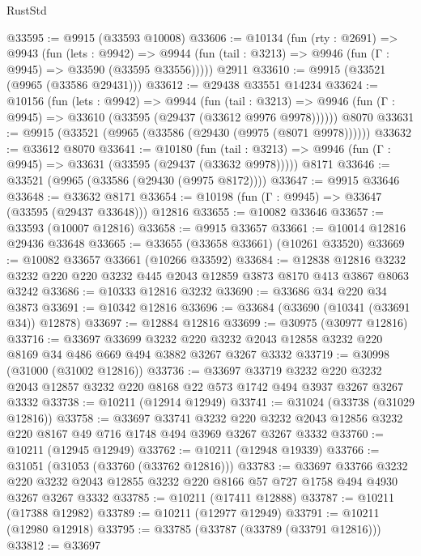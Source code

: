 \begin{lexlean}{RustStd}
\begin{coremodule}
{\begin{coremodule}
{{{{{{{{{{{{{{{{{{{{{{{{{@33595 := @9915 (@33593 @10008)
@33606 := @10134
    (fun (rty : @2691) =>
    @9943
      (fun (lets : @9942) =>
      @9944 (fun (tail : @3213) => @9946 (fun (Γ : @9945) => @33590 (@33595 @33556)))))
    @2911
@33610 := @9915 (@33521 (@9965 (@33586 @29431)))
@33612 := @29438 @33551 @14234
@33624 := @10156
    (fun (lets : @9942) =>
    @9944
      (fun (tail : @3213) =>
      @9946 (fun (Γ : @9945) => @33610 (@33595 (@29437 (@33612 @9976 @9978))))))
    @8070
@33631 := @9915 (@33521 (@9965 (@33586 (@29430 (@9975 (@8071 @9978))))))
@33632 := @33612 @8070
@33641 := @10180
    (fun (tail : @3213) => @9946 (fun (Γ : @9945) => @33631 (@33595 (@29437 (@33632 @9978)))))
    @8171
@33646 := @33521 (@9965 (@33586 (@29430 (@9975 @8172))))
@33647 := @9915 @33646
@33648 := @33632 @8171
@33654 := @10198 (fun (Γ : @9945) => @33647 (@33595 (@29437 @33648))) @12816
@33655 := @10082 @33646
@33657 := @33593 (@10007 @12816)
@33658 := @9915 @33657
@33661 := @10014 @12816 @29436 @33648
@33665 := @33655 (@33658 @33661) (@10261 @33520)
@33669 := @10082 @33657 @33661 (@10266 @33592)
@33684 := @12838
    @12816
    @3232
    @3232
    @220
    @220
    @3232
    @445
    @2043
    @12859
    @3873
    @8170
    @413
    @3867
    @8063
    @3242
@33686 := @10333 @12816 @3232
@33690 := @33686 @34 @220 @34 @3873
@33691 := @10342 @12816
@33696 := @33684 (@33690 (@10341 (@33691 @34)) @12878)
@33697 := @12884 @12816
@33699 := @30975 (@30977 @12816)
@33716 := @33697
    @33699
    @3232
    @220
    @3232
    @2043
    @12858
    @3232
    @220
    @8169
    @34
    @486
    @669
    @494
    @3882
    @3267
    @3267
    @3332
@33719 := @30998 (@31000 (@31002 @12816))
@33736 := @33697
    @33719
    @3232
    @220
    @3232
    @2043
    @12857
    @3232
    @220
    @8168
    @22
    @573
    @1742
    @494
    @3937
    @3267
    @3267
    @3332
@33738 := @10211 (@12914 @12949)
@33741 := @31024 (@33738 (@31029 @12816))
@33758 := @33697
    @33741
    @3232
    @220
    @3232
    @2043
    @12856
    @3232
    @220
    @8167
    @49
    @716
    @1748
    @494
    @3969
    @3267
    @3267
    @3332
@33760 := @10211 (@12945 @12949)
@33762 := @10211 (@12948 @19339)
@33766 := @31051 (@31053 (@33760 (@33762 @12816)))
@33783 := @33697
    @33766
    @3232
    @220
    @3232
    @2043
    @12855
    @3232
    @220
    @8166
    @57
    @727
    @1758
    @494
    @4930
    @3267
    @3267
    @3332
@33785 := @10211 (@17411 @12888)
@33787 := @10211 (@17388 @12982)
@33789 := @10211 (@12977 @12949)
@33791 := @10211 (@12980 @12918)
@33795 := @33785 (@33787 (@33789 (@33791 @12816)))
@33812 := @33697
}}}}}}}}}}}}}}}}}}}}}}}}}
\end{coremodule}}
\end{coremodule}
\end{lexlean}
